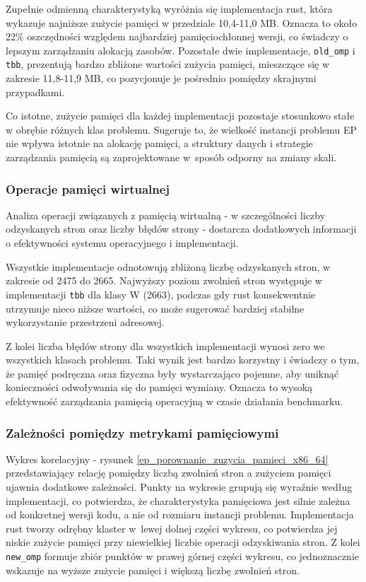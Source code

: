 Zupełnie odmienną charakterystyką wyróżnia się implementacja rust, która wykazuje najniższe zużycie pamięci w przedziale 10,4-11,0 MB. Oznacza to około 22\% oszczędności względem najbardziej pamięciochłonnej wersji, co świadczy o lepszym zarządzaniu alokacją zasobów. Pozostałe dwie implementacje, \texttt{old\_omp} i \texttt{tbb}, prezentują bardzo zbliżone wartości zużycia pamięci, mieszczące się w zakresie 11,8-11,9 MB, co pozycjonuje je pośrednio pomiędzy skrajnymi przypadkami.

Co istotne, zużycie pamięci dla każdej implementacji pozostaje stosunkowo stałe w obrębie różnych klas problemu. Sugeruje to, że wielkość instancji problemu EP nie wpływa istotnie na alokację pamięci, a struktury danych i strategie zarządzania pamięcią są zaprojektowane w~sposób odporny na zmiany skali.

\subsubsection{Operacje pamięci wirtualnej}
Analiza operacji związanych z pamięcią wirtualną - w szczególności liczby odzyskanych stron oraz liczby błędów strony - dostarcza dodatkowych informacji o efektywności systemu operacyjnego i implementacji.

Wszystkie implementacje odnotowują zbliżoną liczbę odzyskanych stron, w zakresie od 2475 do 2665. Najwyższy poziom zwolnień stron występuje w implementacji \texttt{tbb} dla klasy W (2663), podczas gdy rust konsekwentnie utrzymuje nieco niższe wartości, co może sugerować bardziej stabilne wykorzystanie przestrzeni adresowej.

Z kolei liczba błędów strony dla wszystkich implementacji wynosi zero we wszystkich klasach problemu. Taki wynik jest bardzo korzystny i świadczy o tym, że pamięć podręczna oraz fizyczna były wystarczająco pojemne, aby uniknąć konieczności odwoływania się do pamięci wymiany. Oznacza to wysoką efektywność zarządzania pamięcią operacyjną w czasie działania benchmarku.

\subsubsection{Zależności pomiędzy metrykami pamięciowymi}
Wykres korelacyjny - rysunek \ref{ep_porownanie_zuzycia_pamieci_x86_64} przedstawiający relację pomiędzy liczbą zwolnień stron a zużyciem pamięci ujawnia dodatkowe zależności. Punkty na wykresie grupują się wyraźnie według implementacji, co potwierdza, że charakterystyka pamięciowa jest silnie zależna od konkretnej wersji kodu, a nie od rozmiaru instancji problemu. Implementacja rust tworzy odrębny klaster w~lewej dolnej części wykresu, co potwierdza jej niskie zużycie pamięci przy niewielkiej liczbie operacji odzyskiwania stron. Z kolei \texttt{new\_omp} formuje zbiór punktów w prawej górnej części wykresu, co jednoznacznie wskazuje na wyższe zużycie pamięci i większą liczbę zwolnień stron.

